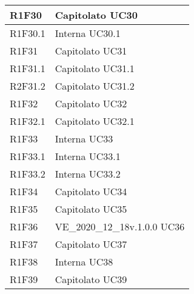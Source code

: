 \begin{center}
\begin{longtable}{|p{22mm}|p{44mm}|}
R1F30 &
Capitolato \newline
UC30 
\\
\hline

R1F30.1 &
Interna \newline
UC30.1 
\\
\hline

R1F31 &
Capitolato \newline
UC31 
\\
\hline

R1F31.1 &
Capitolato \newline
UC31.1 
\\
\hline

R2F31.2 &
Capitolato \newline
UC31.2 
\\
\hline

R1F32 &
Capitolato \newline
UC32 
\\
\hline

R1F32.1 &
Capitolato \newline
UC32.1 
\\
\hline

R1F33 &
Interna \newline
UC33 
\\
\hline

R1F33.1 &
Interna \newline
UC33.1 
\\
\hline

R1F33.2 &
Interna \newline
UC33.2 
\\
\hline

R1F34 &
Capitolato \newline
UC34 
\\
\hline

R1F35 &
Capitolato \newline
UC35 
\\
\hline

R1F36 &
VE\_2020\_12\_18v.1.0.0 \newline
UC36 
\\
\hline

R1F37 &
Capitolato \newline
UC37 
\\
\hline

R1F38 &
Interna \newline
UC38 
\\
\hline

R1F39 &
Capitolato \newline
UC39 
\\
\hline


\end{longtable}
\end{center}
